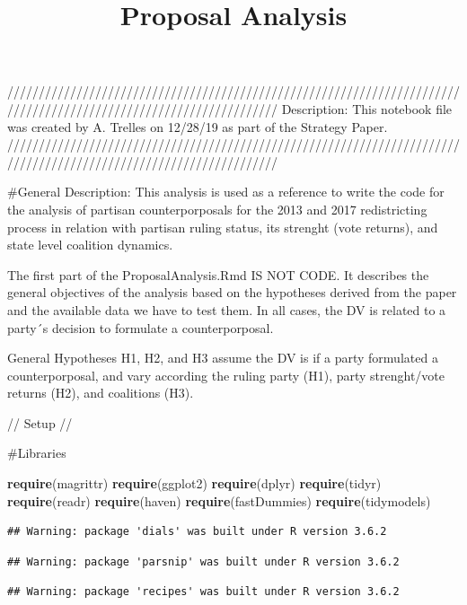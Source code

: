 \documentclass[]{article}
\title{Proposal Analysis}
\author{}
\date{}
\newenvironment{Shaded}{\begin{snugshade}}{\end{snugshade}}
\newcommand{\KeywordTok}[1]{\textcolor[rgb]{0.13,0.29,0.53}{\textbf{#1}}}
\newcommand{\NormalTok}[1]{#1}
\begin{document}
\maketitle

///////////////////////////////////////////////////////////////////////////////////////////////////////////////////
Description: This notebook file was created by A. Trelles on 12/28/19 as
part of the Strategy Paper.
///////////////////////////////////////////////////////////////////////////////////////////////////////////////////

\#General Description: This analysis is used as a reference to write the
code for the analysis of partisan counterporposals for the 2013 and 2017
redistricting process in relation with partisan ruling status, its
strenght (vote returns), and state level coalition dynamics.

The first part of the ProposalAnalysis.Rmd IS NOT CODE. It describes the
general objectives of the analysis based on the hypotheses derived from
the paper and the available data we have to test them. In all cases, the
DV is related to a party´s decision to formulate a counterporposal.

General Hypotheses H1, H2, and H3 assume the DV is if a party formulated
a counterporposal, and vary according the ruling party (H1), party
strenght/vote returns (H2), and coalitions (H3).

// Setup //

\#Libraries

\begin{Shaded}
\begin{Highlighting}[]
\KeywordTok{require}\NormalTok{(magrittr)}
\KeywordTok{require}\NormalTok{(ggplot2)}
\KeywordTok{require}\NormalTok{(dplyr)}
\KeywordTok{require}\NormalTok{(tidyr)}
\KeywordTok{require}\NormalTok{(readr)}
\KeywordTok{require}\NormalTok{(haven)}
\KeywordTok{require}\NormalTok{(fastDummies)}
\KeywordTok{require}\NormalTok{(tidymodels)}
\end{Highlighting}
\end{Shaded}

\begin{verbatim}
## Warning: package 'dials' was built under R version 3.6.2
\end{verbatim}

\begin{verbatim}
## Warning: package 'parsnip' was built under R version 3.6.2
\end{verbatim}

\begin{verbatim}
## Warning: package 'recipes' was built under R version 3.6.2
\end{verbatim}
\end{document}
